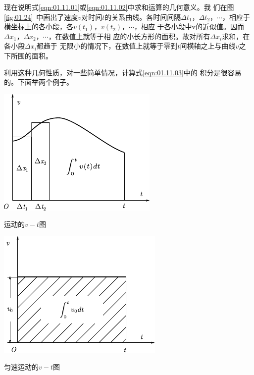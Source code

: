 现在说明式\eqref{eqn:01.11.01}或\eqref{eqn:01.11.02}中求和运算的几何意义。我
们在图\ref{fig:01.24}~中画出了速度$v$对时间$t$的关系曲线。各时间间隔$\Delta t_1$，$\Delta t_2$，$\cdots$，相应于横坐标上的各小段，各$v(t_1)$，$v(t_2)$，$\cdots$，相应
于各小段中v的近似值。因而$\Delta x_1$，$\Delta x_2$，$\cdots$，在数值上就等于相
应的小长方形的面积。故对所有$\Delta x_i$求和，在各小段$\Delta x_i$都趋于
无限小的情况下，在数值上就等于零到$t$间横轴之上与曲线$v$之
下所围的面积。

    利用这种几何性质，对一些简单情况，计算式\eqref{eqn:01.11.03}中的
积分是很容易的。下面举两个例子。
\begin{figurex}[!h]
    \begin{minipage}[b]{14em}
        \centering
        \includegraphics[width=0.8\linewidth]{figure/fig01.24}
        \caption{运动的$v-t$图}
        \label{fig:01.24}
    \end{minipage}\hfill
    \begin{minipage}[b]{14em}
        \centering
        \includegraphics[width=0.8\linewidth]{figure/fig01.25}
        \caption{匀速运动的$v-t$图}
        \label{fig:01.25}
    \end{minipage}
\end{figurex}

